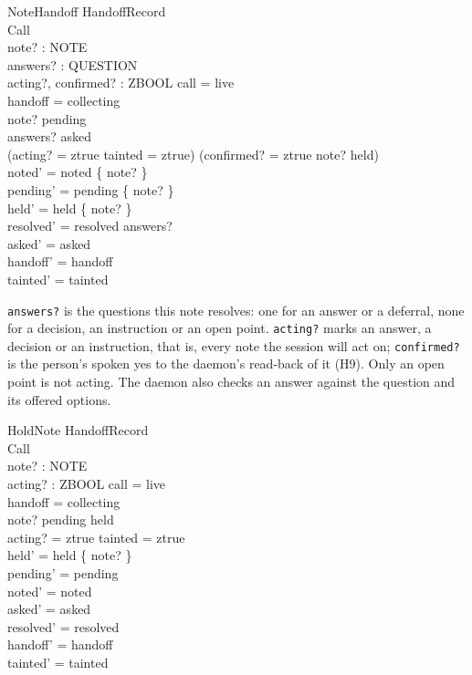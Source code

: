 \documentclass[a4paper,10pt,fleqn]{article}
\begin{document}
\begin{schema}{NoteHandoff}
  \Delta HandoffRecord \\
  Call \\
  note? : NOTE \\
  answers? : \power QUESTION \\
  acting?, confirmed? : ZBOOL
\where
  call = live \\
  handoff = collecting \\
  note? \in pending \\
  answers? \subseteq asked \\
  (acting? = ztrue \land tainted = ztrue) \implies
    (confirmed? = ztrue \land note? \in held) \\
  noted' = noted \cup \{ note? \} \\
  pending' = pending \setminus \{ note? \} \\
  held' = held \setminus \{ note? \} \\
  resolved' = resolved \cup answers? \\
  asked' = asked \\
  handoff' = handoff \\
  tainted' = tainted
\end{schema}

\texttt{answers?} is the questions this note resolves: one for an answer
or a deferral, none for a decision, an instruction or an open point.
\texttt{acting?} marks an answer, a decision or an instruction, that is,
every note the session will act on; \texttt{confirmed?} is the person's
spoken yes to the daemon's read-back of it (H9). Only an open point is not
acting. The daemon also checks an answer against the question and its offered
options.

\begin{schema}{HoldNote}
  \Delta HandoffRecord \\
  Call \\
  note? : NOTE \\
  acting? : ZBOOL
\where
  call = live \\
  handoff = collecting \\
  note? \in pending \setminus held \\
  acting? = ztrue \land tainted = ztrue \\
  held' = held \cup \{ note? \} \\
  pending' = pending \\
  noted' = noted \\
  asked' = asked \\
  resolved' = resolved \\
  handoff' = handoff \\
  tainted' = tainted
\end{schema}
\end{document}
